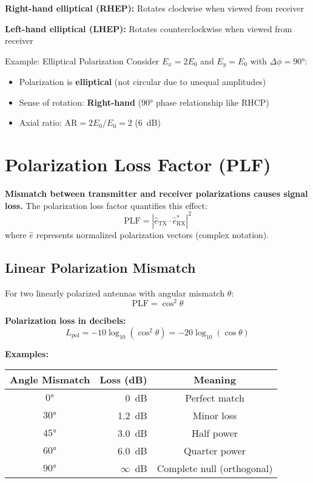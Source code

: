 \begin{center}
\textbf{Right-hand elliptical (RHEP):} Rotates clockwise when viewed from receiver

\textbf{Left-hand elliptical (LHEP):} Rotates counterclockwise when viewed from receiver

\begin{calloutbox}{Example: Elliptical Polarization}
Consider $E_x = 2E_0$ and $E_y = E_0$ with $\Delta\phi = 90°$:
\begin{itemize}
\item Polarization is \textbf{elliptical} (not circular due to unequal amplitudes)
\item Sense of rotation: \textbf{Right-hand} ($90°$ phase relationship like RHCP)
\item Axial ratio: $\mathrm{AR} = 2E_0/E_0 = 2$ (6~dB)
\end{itemize}
\end{calloutbox}

\section{Polarization Loss Factor (PLF)}

\textbf{Mismatch between transmitter and receiver polarizations causes signal loss.} The polarization loss factor quantifies this effect:
\begin{equation}
\mathrm{PLF} = |\hat{e}_{\text{TX}} \cdot \hat{e}_{\text{RX}}^*|^2
\label{eq:plf}
\end{equation}
where $\hat{e}$ represents normalized polarization vectors (complex notation).

\subsection{Linear Polarization Mismatch}

For two linearly polarized antennas with angular mismatch $\theta$:
\begin{equation}
\mathrm{PLF} = \cos^2\theta
\label{eq:plf-linear}
\end{equation}

\textbf{Polarization loss in decibels:}
\begin{equation}
L_{\text{pol}} = -10\log_{10}(\cos^2\theta) = -20\log_{10}(\cos\theta)
\label{eq:pol-loss-db}
\end{equation}

\textbf{Examples:}

\begin{center}
\begin{tabular}{@{}crc@{}}
\toprule
\textbf{Angle Mismatch} & \textbf{Loss (dB)} & \textbf{Meaning} \\
\midrule
$0°$ & 0~dB & Perfect match \\
$30°$ & 1.2~dB & Minor loss \\
$45°$ & 3.0~dB & Half power \\
$60°$ & 6.0~dB & Quarter power \\
$90°$ & $\infty$~dB & Complete null (orthogonal) \\
\bottomrule
\end{tabular}
\end{center}


\end{center}
